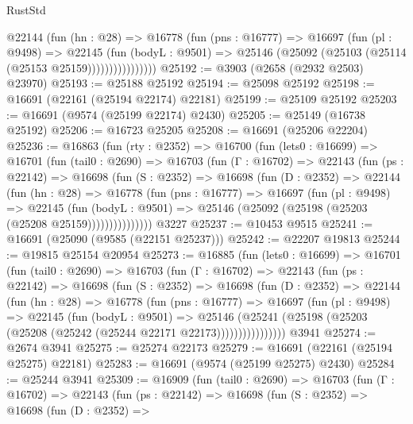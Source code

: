 \begin{lexlean}{RustStd}
\begin{coremodule}
                  @22144
                    (fun (hn : @28) =>
                    @16778
                      (fun (pns : @16777) =>
                      @16697
                        (fun (pl : @9498) =>
                        @22145
                          (fun (bodyL : @9501) =>
                          @25146 (@25092 (@25103 (@25114 (@25153 @25159))))))))))))))))
@25192 := @3903 (@2658 (@2932 @2503) @23970)
@25193 := @25188 @25192
@25194 := @25098 @25192
@25198 := @16691 (@22161 (@25194 @22174) @22181)
@25199 := @25109 @25192
@25203 := @16691 (@9574 (@25199 @22174) @2430)
@25205 := @25149 (@16738 @25192)
@25206 := @16723 @25205
@25208 := @16691 (@25206 @22204)
@25236 := @16863
    (fun (rty : @2352) =>
    @16700
      (fun (lets0 : @16699) =>
      @16701
        (fun (tail0 : @2690) =>
        @16703
          (fun (Γ : @16702) =>
          @22143
            (fun (ps : @22142) =>
            @16698
              (fun (S : @2352) =>
              @16698
                (fun (D : @2352) =>
                @22144
                  (fun (hn : @28) =>
                  @16778
                    (fun (pns : @16777) =>
                    @16697
                      (fun (pl : @9498) =>
                      @22145
                        (fun (bodyL : @9501) =>
                        @25146 (@25092 (@25198 (@25203 (@25208 @25159)))))))))))))))
    @3227
@25237 := @10453 @9515
@25241 := @16691 (@25090 (@9585 (@22151 @25237)))
@25242 := @22207 @19813
@25244 := @19815 @25154 @20954
@25273 := @16885
    (fun (lets0 : @16699) =>
    @16701
      (fun (tail0 : @2690) =>
      @16703
        (fun (Γ : @16702) =>
        @22143
          (fun (ps : @22142) =>
          @16698
            (fun (S : @2352) =>
            @16698
              (fun (D : @2352) =>
              @22144
                (fun (hn : @28) =>
                @16778
                  (fun (pns : @16777) =>
                  @16697
                    (fun (pl : @9498) =>
                    @22145
                      (fun (bodyL : @9501) =>
                      @25146
                        (@25241
                          (@25198 (@25203 (@25208 (@25242 (@25244 @22171 @22173))))))))))))))))
    @3941
@25274 := @2674 @3941
@25275 := @25274 @22173
@25279 := @16691 (@22161 (@25194 @25275) @22181)
@25283 := @16691 (@9574 (@25199 @25275) @2430)
@25284 := @25244 @3941
@25309 := @16909
    (fun (tail0 : @2690) =>
    @16703
      (fun (Γ : @16702) =>
      @22143
        (fun (ps : @22142) =>
        @16698
          (fun (S : @2352) =>
          @16698
            (fun (D : @2352) =>

\end{coremodule}
\end{lexlean}
